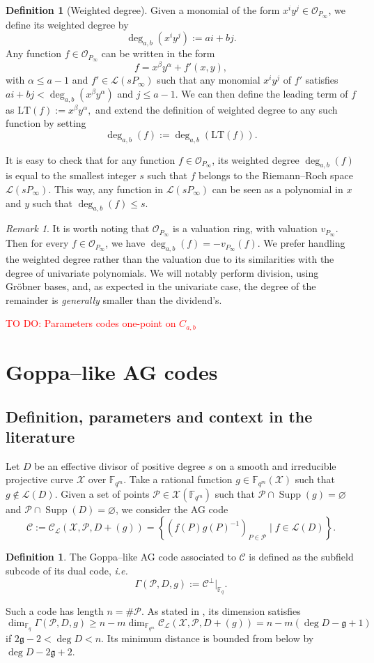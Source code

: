 \documentclass[a4paper]{amsart}
\theoremstyle{definition}
\newtheorem{definition}[thm]{Definition}
\theoremstyle{remark}
\newtheorem{remark}[thm]{Remark}
\newcommand{\calP}{\mathcal{P}}
\newcommand{\calL}{\mathcal{L}}
\newcommand{\calC}{\mathcal{C}}
\newcommand{\calO}{\mathcal{O}}
\newcommand{\calX}{\mathcal{X}}
\newcommand{\fqm}{\mathbb{F}_{q^m}}
\newcommand{\fq}{\mathbb{F}_{q}}
\newcommand{\set}[1]{\left\{#1\right\}}
\newcommand{\Supp}{\operatorname{Supp}}
\newcommand{\degab}[1]{\deg_{a,b}\left(#1\right)}
\newcommand\TODO[1]{\textcolor{red}{TO DO: #1}}
\begin{document}
\begin{definition}[Weighted degree]
Given a monomial of the form $x^iy^j \in \calO_{P_\infty}$, we define its weighted degree by
\[ \degab{x^iy^j} := ai+bj.\]
%
Any function $f \in \calO_{P_\infty}$ can be written in the form $$f = x^{\beta}y^{\alpha} + f'(x,y),$$
with $\alpha \leq a-1$ and $f' \in \calL(sP_{\infty})$ such that any monomial $x^iy^j$ of $f'$ satisfies $ai+bj < \degab{x^{\beta}y^{\alpha}}$ and $j \leq a-1$. We can then define the leading term of $f$ as $\mathrm{LT}(f) := x^{\beta}y^{\alpha},$ and extend the definition of weighted degree to any such function by setting 
\[\degab{f} := \degab{\mathrm{LT}(f)}.\]
\end{definition}
It is easy to check that for any function $f \in \calO_{P_\infty}$, its weighted degree $\degab{f}$ is equal to the smallest integer $s$ such that $f$ belongs to the Riemann--Roch space $\calL(sP_{\infty})$.
%
This way, any function in $\calL(sP_\infty)$ can be seen as a polynomial in $x$ and $y$ such that $\degab{f}\leq s$. 
\begin{remark}
It is worth noting that $\calO_{P_\infty}$ is a valuation ring, with valuation $v_{P_\infty}$. Then for every $f \in \calO_{P_\infty}$, we have $\degab{f}=-v_{P_\infty}(f)$. We prefer handling the weighted degree rather than the valuation due to its similarities with the degree of univariate 
polynomials. We will notably perform division, using Gr\"obner bases, and, as expected in the univariate case, the degree of the remainder is 
\textit{generally} smaller than the dividend's.
\end{remark}

\TODO{Parameters codes one-point on $C_{a,b}$}

\section{Goppa--like AG codes}\label{sec:Goppa}
\subsection{Definition, parameters and context in the literature}\label{subsec:def-Goppa}
Let $D$ be an effective divisor of positive degree $s$ on a smooth and irreducible projective curve $\calX$ over $\fqm$. Take a rational function $g \in \fqm(\calX)$ such that $g \notin \calL(D)$. Given a set of points $\calP \in \calX(\fqm)$ such that $\calP \cap \Supp(g) = \varnothing$ and $\calP \cap \Supp(D) = \varnothing$, we consider the AG code
\[\calC := \calC_{\calL}(\calX,\calP,D+(g))=\set{\left(f(P)g(P)^{-1}\right)_{P \in \calP} \mid f \in \calL(D)}.\]
\begin{definition} \label{def:Goppa--like_AG_code}
The Goppa--like AG code associated to $\calC$ is defined as the subfield subcode of its dual code, \emph{i.e.}
\[ \Gamma(\calP,D,g) := \calC^{\perp}|_{\fq}.\]
\end{definition}%
%
Such a code has length $n = \# \calP$. As stated in \cite[Theorem~1]{JM96}, its dimension satisfies 
\[\dim_{\fq} \Gamma(\calP,D,g) \geq n-m \dim_{\fqm} \calC_{\calL}(\calX,\calP,D+(g)) =n-m(\deg D - \mathfrak{g} +1 )\]
if $2\mathfrak{g} - 2 < \deg D < n$. Its minimum distance is bounded from below by $\deg D - 2 \mathfrak{g} + 2$.
\end{document}
